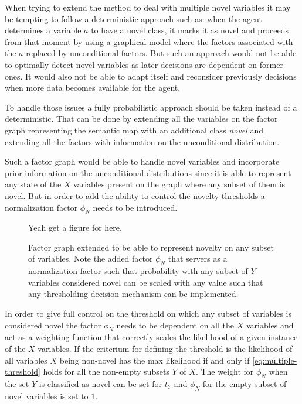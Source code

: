 When trying to extend the method to deal with multiple novel variables it may
be tempting to follow a deterministic approach such as:
when the agent determines a variable $a$ to have a novel class, it marks it as
novel and proceeds from that moment by using a graphical model where the factors
associated with the $a$ replaced by unconditional factors.
But such an approach would not be able to optimally detect novel variables
as later decisions are dependent on former ones.
It would also not be able to adapt itself and reconsider previously decisions
when more data becomes available for the agent.

To handle those issues a fully probabilistic approach should be taken
instead of a deterministic.
That can be done by extending all the variables on the factor graph representing
the semantic map with an additional class \emph{novel} and extending all the
factors with information on the unconditional distribution.

Such a factor graph would be able to handle novel variables and incorporate
prior-information on the unconditional distributions since it is able to
represent any state of the $X$ variables present on the graph where any
subset of them is novel. But in order to add the ability to control the
novelty thresholds a normalization factor $\phi_N$ needs to be introduced.

\begin{figure}[h]
\centering
Yeah get a figure for here.
\caption{\label{fig:multiple-big-threshold}Factor graph extended to be able to
         represent novelty on any subset of variables. Note the added factor
         $\phi_N$ that servers as a normalization factor such that probability
         with any subset of $Y$ variables considered novel can be scaled with
         any value such that any thresholding decision mechanism can be
         implemented.}
\end{figure}

In order to give full control on the threshold on which any subset of
variables is considered novel the factor $\phi_N$ needs to be dependent on all
the $X$ variables and act as a weighting function that correctly scales the
likelihood of a given instance of the $X$ variables.
If the criterium for defining the threshold is the likelihood of all variables
$X$ being non-novel has the max likelihood if and only if
\autoref{eq:multiple-threshold} holds for all the non-empty subsets $Y$ of $X$.
The weight for $\phi_N$ when the set $Y$ is classified as novel
can be set for $t_Y$ and $\phi_N$ for the empty subset of novel variables is set
to $1$.

